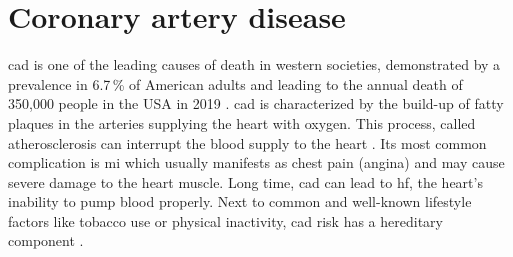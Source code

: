 \section{Coronary artery disease}
\label{sec:cad}
\Ac{cad} is one of the leading causes of death in western societies, demonstrated by a prevalence in 6.7\,\% of American adults and leading to the annual death of 350,000 people in the USA in 2019 \cite{centersfordiseasecontrolandpreventionHeartDiseaseFacts2022, fryarPrevalenceUncontrolledRisk2012}. \Ac{cad} is characterized by the build-up of fatty plaques in the arteries supplying the heart with oxygen. This process, called atherosclerosis can interrupt the blood supply to the heart \cite{nationalhealthserviceHeartAttack2017}. Its most common complication is \ac{mi} which usually manifests as chest pain (angina) and may cause severe damage to the heart muscle. Long time, \ac{cad} can lead to \ac{hf}, the heart's inability to pump blood properly. Next to common and well-known lifestyle factors like tobacco use or physical inactivity, \ac{cad} risk has a hereditary component \cite{montalescot2013ESCGuidelines2013}.


